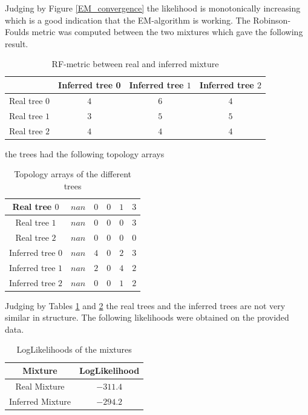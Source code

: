 Judging by Figure \ref{EM_convergence} the likelihood is monotonically increasing which is a good indication that the EM-algorithm is working. The Robinson-Foulds metric was computed between the two mixtures which gave the following result.


\begin{table}

  \centering
  \begin{tabular}{ | c | c | c | c |}
  \hline
   & Inferred tree 0 & Inferred tree $1$ & Inferred tree $2$ \\ \hline
  Real tree $0$ & $4$ & $6$ & $4$ \\ \hline
  Real tree $1$ & $3$ & $5$ & $5$  \\ \hline
  Real tree $2$ & $4$ & $4$ & $4$  \\ \hline
  \end{tabular}
  \caption{RF-metric between real and inferred mixture}
  \label{RF-metric_real_inferred}
\end{table}

the trees had the following topology arrays

\begin{table}[H]

  \centering
  \begin{tabular}{ | c | c | c | c | c | c |}
  \hline
  Real tree $0$ & $nan$ & $0$ & $0$ & $1$ & $3$\\ \hline
  Real tree $1$ & $nan$ & $0$ & $0$ & $0$ & $3$  \\ \hline
  Real tree $2$ & $nan$ & $0$ & $0$ & $0$ & $0$  \\ \hline
  Inferred tree $0$ & $nan$ & $4$ & $0$ & $2$ & $3$ \\ \hline
  Inferred tree $1$ & $nan$ & $2$ & $0$ & $4$ & $2$  \\ \hline
  Inferred tree $2$ & $nan$ & $0$ & $0$ & $1$ & $2$  \\ \hline
  \end{tabular}
  \caption{Topology arrays of the different trees}
  \label{topology_array}
\end{table}

Judging by Tables \ref{RF-metric_real_inferred} and \ref{topology_array} the real trees and the inferred trees are not very similar in structure. The following likelihoods were obtained on the provided data.

\begin{table}[H]

  \centering
  \begin{tabular}{ | c | c |}
  \hline
  Mixture & LogLikelihood \\ \hline
  Real Mixture & $-311.4$\\ \hline
  Inferred Mixture & $-294.2$\\ \hline
  \end{tabular}
  \caption{LogLikelihoods of the mixtures}
  \label{Likelihood}
\end{table}

